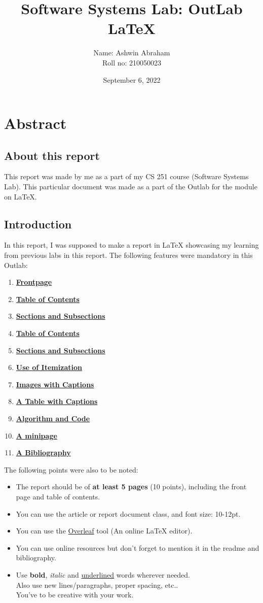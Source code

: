 \documentclass[12pt]{report}
\title{\Huge \textbf{Software Systems Lab: OutLab} \\ \textbf{\LaTeX{}}}
\author{\Large Name: Ashwin Abraham \\ \Large Roll no: 210050023}
\date{\Large September 6, 2022}
\begin{document}
\begin{titlepage}
    \maketitle
\end{titlepage}

\tableofcontents
\newpage

\chapter{Abstract}
\section{About this report}
This report was made by me as a part of my CS 251 course (Software Systems Lab).
This particular document was made as a part of the Outlab for the module on \LaTeX{}.
\section{Introduction}
In this report, I was supposed to make a report in \LaTeX{} showcasing my learning from previous labs in this report.
The following features were mandatory in this Outlab:
\begin{enumerate}
    \item \underline{\textbf{Frontpage}}
    \item \underline{\textbf{Table of Contents}}
    \item \underline{\textbf{Sections and Subsections}}
    \item \underline{\textbf{Table of Contents}}
    \item \underline{\textbf{Sections and Subsections}}
    \item \underline{\textbf{Use of Itemization}}
    \item \underline{\textbf{Images with Captions}}
    \item \underline{\textbf{A Table with Captions}}
    \item \underline{\textbf{Algorithm and Code}}
    \item \underline{\textbf{A minipage}}
    \item \underline{\textbf{A Bibliography}}
\end{enumerate}
The following points were also to be noted:
\begin{itemize}
    \item The report should be of \textbf{at least 5 pages} (10 points), including the front page and table of contents.
    \item You can use the article or report document class, and font size: 10-12pt.
    \item You can use the \underline{Overleaf} tool (An online \LaTeX{} editor).
    \item You can use online resources but don't forget to mention it in the readme and bibliography.
    \item Use \textbf{bold}, \textit{italic} and \underline{underlined} words wherever needed. \\ Also use new lines/paragraphs, proper spacing, etc..\\ You've to be creative with your work.
\end{itemize}
\end{document}
